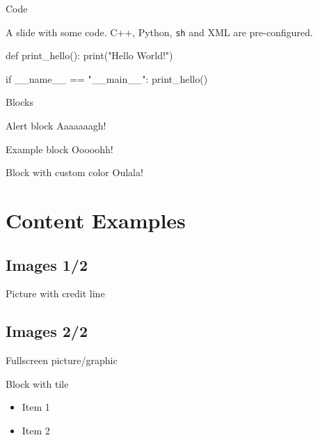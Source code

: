\documentclass[compress,aspectratio=169]{beamer}
\begin{document}
\begin{frame}[fragile]{Code}

    A slide with some code. C++, Python, \texttt{sh} and XML are pre-configured.

    \begin{pythoncode}

        def print_hello():
        print("Hello World!")


        if __name__ == "__main__":
        print_hello()
    \end{pythoncode}

\end{frame}


\begin{frame}[containsverbatim]{Blocks}
\begin{alertblock}{Alert block}
    Aaaaaaagh!
\end{alertblock}

\begin{exampleblock}{Example block}
    Ooooohh!
\end{exampleblock}

\begingroup
{}
\begin{block}{Block with custom color}
    Oulala!
\end{block}
\endgroup
\end{frame}

\section{Content Examples}

\subsection{Images 1/2}
\begin{frame}{Picture with credit line}
    \begin{figure}
        \centering
    \end{figure}
\end{frame}

\subsection{Images 2/2}
{
    \begin{frame}{Fullscreen picture/graphic}
        \textcolor{white}{
            Normal text goes here.
        }
        \begin{block}{Block with tile}
            \begin{itemize}
                \item Item 1
                \item Item 2
            \end{itemize}
        \end{block}
    \end{frame}
}
\end{document}
